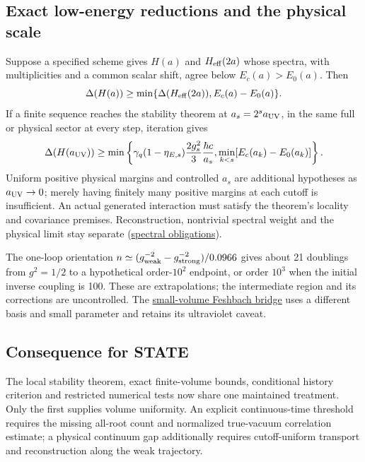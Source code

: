 \documentclass[11pt,a4paper]{article}
\begin{document}
\hypertarget{exact-low-energy-reductions-and-the-physical-scale}{%
\subsection{Exact low-energy reductions and the physical
scale}\label{exact-low-energy-reductions-and-the-physical-scale}}

Suppose a specified scheme gives \(H(a)\) and \(H_{\rm eff}(2a)\) whose
spectra, with multiplicities and a common scalar shift, agree below
\(E_c(a)>E_0(a)\). Then
\[\Delta(H(a))\ge\min\{\Delta(H_{\rm eff}(2a)),E_c(a)-E_0(a)\}.\] If a
finite sequence reaches the stability theorem at \(a_s=2^sa_{\rm UV}\),
in the same full or physical sector at every step, iteration gives
\[\Delta(H(a_{\rm UV}))\ge\min\left\{
 \gamma_q(1-\eta_{E,s})\frac{2g_s^2}{3}\frac{\hbar c}{a_s},
 \min_{k<s}[E_c(a_k)-E_0(a_k)]\right\}.\] Uniform positive physical
margins and controlled \(a_s\) are additional hypotheses as
\(a_{\rm UV}\to0\); merely having finitely many positive margins at each
cutoff is insufficient. An actual generated interaction must satisfy the
theorem's locality and covariance premises. Reconstruction, nontrivial
spectral weight and the physical limit stay separate
(\href{mass-gap-obligations-lattice.md}{spectral obligations}).

The one-loop orientation
\(n\simeq(g_{\rm weak}^{-2}-g_{\rm strong}^{-2})/0.0966\) gives about 21
doublings from \(g^2=1/2\) to a hypothetical order-\(10^2\) endpoint, or
order \(10^3\) when the initial inverse coupling is 100. These are
extrapolations; the intermediate region and its corrections are
uncontrolled. The
\href{weak-coupling-feshbach-reduction.md}{small-volume Feshbach bridge}
uses a different basis and small parameter and retains its ultraviolet
caveat.

\hypertarget{consequence-for-state}{%
\subsection{Consequence for STATE}\label{consequence-for-state}}

The local stability theorem, exact finite-volume bounds, conditional
history criterion and restricted numerical tests now share one
maintained treatment. Only the first supplies volume uniformity. An
explicit continuous-time threshold requires the missing all-root count
and normalized true-vacuum correlation estimate; a physical continuum
gap additionally requires cutoff-uniform transport and reconstruction
along the weak trajectory.
\end{document}

